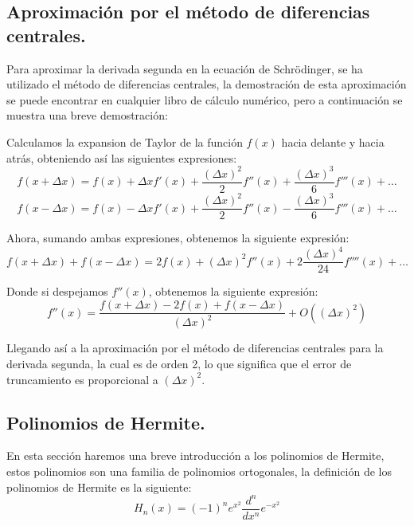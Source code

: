 \documentclass[10pt,onecolumn]{article}
\begin{document}
\subsection{Aproximación por el método de diferencias centrales.}

Para aproximar la derivada segunda en la ecuación de Schrödinger, se ha utilizado el método de diferencias centrales, la demostración de esta aproximación se puede encontrar en cualquier libro de cálculo numérico, pero a continuación se muestra una breve demostración:

Calculamos la expansion de Taylor de la función $f(x)$ hacia delante y hacia atrás, obteniendo así las siguientes expresiones:
\begin{equation}
    f(x + \Delta x) = f(x) + \Delta x f'(x) + \dfrac{(\Delta x)^2}{2} f''(x) + \dfrac{(\Delta x)^3}{6} f'''(x) + \ldots
\end{equation}
\begin{equation}
    f(x - \Delta x) = f(x) - \Delta x f'(x) + \dfrac{(\Delta x)^2}{2} f''(x) - \dfrac{(\Delta x)^3}{6} f'''(x) + \ldots
\end{equation}

Ahora, sumando ambas expresiones, obtenemos la siguiente expresión:
\begin{equation}
    f(x + \Delta x) + f(x - \Delta x) = 2 f(x) + (\Delta x)^2 f''(x) + 2\dfrac{(\Delta x)^4}{24} f''''(x) + \ldots
\end{equation}

Donde si despejamos $f''(x)$, obtenemos la siguiente expresión:
\begin{equation}
    f''(x) = \dfrac{f(x + \Delta x) - 2 f(x) + f(x - \Delta x)}{(\Delta x)^2} + O((\Delta x)^2)
\end{equation}

Llegando así a la aproximación por el método de diferencias centrales para la derivada segunda, la cual es de orden 2, lo que significa que el error de truncamiento es proporcional a $(\Delta x)^2$.



\subsection{Polinomios de Hermite.}

En esta sección haremos una breve introducción a los polinomios de Hermite, estos polinomios son una familia de polinomios ortogonales, la definición de los polinomios de Hermite es la siguiente:
\begin{equation}
    H_n(x) = (-1)^n e^{x^2} \dfrac{d^n}{dx^n} e^{-x^2}
\end{equation}
\end{document}
